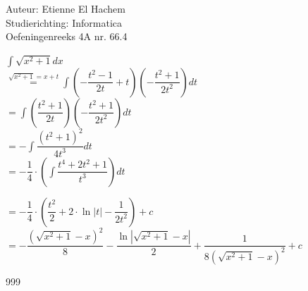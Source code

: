 \documentclass[a4paper]{article}
\begin{document}
  
\noindent \large Auteur: Etienne El Hachem \\
\noindent \large Studierichting: Informatica\\
\noindent \large Oefeningenreeks 4A nr. 66.4\\

\medskip

\normalsize

$\displaystyle\int \sqrt{x^2 + 1}dx$ \\

$ \stackrel{\sqrt{x^2+1}= x+ t}= \displaystyle\int \left(-\dfrac{t^2-1}{2t}+t\right)\left(-\dfrac{t^2+1}{2t^2}\right)dt$ \\

$ = \displaystyle\int \left(\dfrac{t^2+1}{2t}\right)\left(-\dfrac{t^2+1}{2t^2}\right)dt$ \\

$ = -\displaystyle\int \dfrac{(t^2+1)^2}{4t^3}dt$ \\

$ = -\dfrac{1}{4} \cdot \left( \displaystyle\int \dfrac{t^4+2t^2+1}{t^3} \right)dt$

$ = -\dfrac{1}{4} \cdot \left( \dfrac{t^2}{2}+2\cdot \ln |t| - \dfrac{1}{2t^2} \right) + c$ \\

$ = -\dfrac{(\sqrt{x^2+1}-x)^2}{8} - \dfrac{\ln |\sqrt{x^2+1}-x|}{2} + \dfrac{1}{8(\sqrt{x^2+1}-x)^2}+c$

\begin{thebibliography}{999}
\end{thebibliography}
\end{document}
